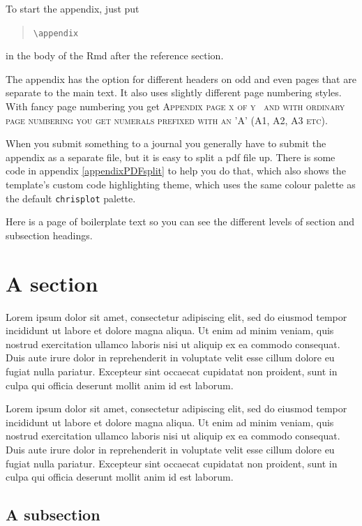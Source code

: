 \documentclass[
  a4paper,
  twoside]{article}
\begin{document}
To start the appendix, just put

\begin{quote}
\texttt{\textbackslash{}appendix}
\end{quote}

in the body of the Rmd after the reference section.

The appendix has the option for different headers on odd and even pages that are separate to the main text. It also uses slightly different page numbering styles. With fancy page numbering you get \begingroup \sffamily\scshape\color{black!60}\fontsize{11}{12}\selectfont
Appendix page x of y%
\endgroup\ and with ordinary page numbering you get numerals prefixed with an 'A' (A1, A2, A3 etc). 

When you submit something to a journal you generally have to submit the appendix as a separate file, but it is easy to split a pdf file up. There is some code in appendix \ref{appendixPDFsplit} to help you do that, which also shows the template's custom code highlighting theme, which uses the same colour palette as the default \texttt{chrisplot} palette.

\newpage

Here is a page of boilerplate text so you can see the different levels of section and subsection headings.

\section{A section}\label{a-section}

Lorem ipsum dolor sit amet, consectetur adipiscing elit, sed do eiusmod tempor incididunt ut labore et dolore magna aliqua. Ut enim ad minim veniam, quis nostrud exercitation ullamco laboris nisi ut aliquip ex ea commodo consequat. Duis aute irure dolor in reprehenderit in voluptate velit esse cillum dolore eu fugiat nulla pariatur. Excepteur sint occaecat cupidatat non proident, sunt in culpa qui officia deserunt mollit anim id est laborum.

Lorem ipsum dolor sit amet, consectetur adipiscing elit, sed do eiusmod tempor incididunt ut labore et dolore magna aliqua. Ut enim ad minim veniam, quis nostrud exercitation ullamco laboris nisi ut aliquip ex ea commodo consequat. Duis aute irure dolor in reprehenderit in voluptate velit esse cillum dolore eu fugiat nulla pariatur. Excepteur sint occaecat cupidatat non proident, sunt in culpa qui officia deserunt mollit anim id est laborum.

\subsection{A subsection}\label{a-subsection}
\end{document}
